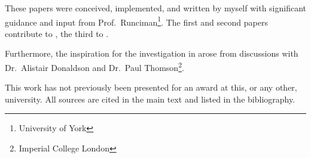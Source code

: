 These papers were conceived, implemented, and written by myself with significant guidance and input
from Prof.~Runciman\footnote{University of York}.  The first and second papers contribute to
, the third to .

Furthermore, the inspiration for the investigation in  arose from discussions
with Dr.~Alistair Donaldson and Dr.~Paul Thomson\footnote{Imperial College London}.

This work has not previously been presented for an award at this, or any other, university.  All
sources are cited in the main text and listed in the bibliography.
